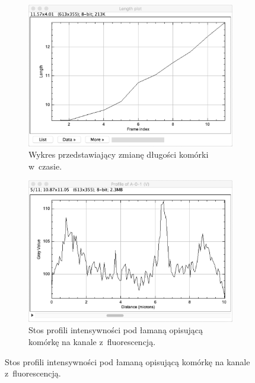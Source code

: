 \documentclass[declaration,shortabstract,mgr]{iithesis}
\begin{document}
\begin{figure}
  \centering

  \begin{subfigure}[t]{.45\textwidth}
    \centering
    \includegraphics[width=\textwidth]{images/ui-plot-lengths.png}
    \caption{\centering Wykres przedstawiający zmianę długości komórki w~czasie.}
  \end{subfigure}
  \hfill
  \begin{subfigure}[t]{.45\textwidth}
    \centering
    \includegraphics[width=\textwidth]{images/ui-plot-profiles.png}
    \caption{\centering Stos profili intensywności pod łamaną opisującą komórkę na kanale z~fluorescencją.}
  \end{subfigure}
  \hfill

  \par\bigskip


\end{figure}
\end{document}
